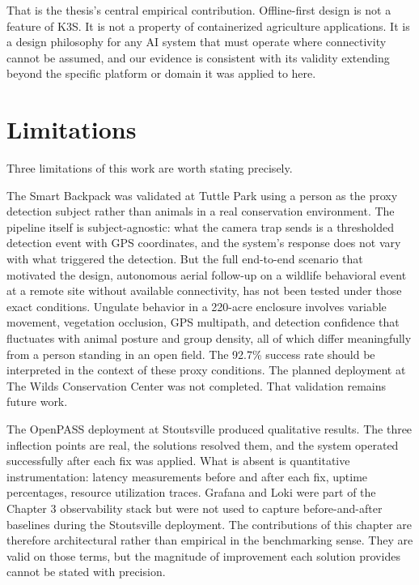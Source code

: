 That is the thesis's central empirical contribution. Offline-first design is not a feature of K3S. It is not a property of containerized agriculture applications. It is a design philosophy for any AI system that must operate where connectivity cannot be assumed, and our evidence is consistent with its validity extending beyond the specific platform or domain it was applied to here.

\section{Limitations}
\label{sec:concl_rq3}
Three limitations of this work are worth stating precisely.

The Smart Backpack was validated at Tuttle Park using a person as the proxy detection subject rather than animals in a real conservation environment. The pipeline itself is subject-agnostic: what the camera trap sends is a thresholded detection event with GPS coordinates, and the system's response does not vary with what triggered the detection. But the full end-to-end scenario that motivated the design, autonomous aerial follow-up on a wildlife behavioral event at a remote site without available connectivity, has not been tested under those exact conditions. Ungulate behavior in a 220-acre enclosure involves variable movement, vegetation occlusion, GPS multipath, and detection confidence that fluctuates with animal posture and group density, all of which differ meaningfully from a person standing in an open field. The 92.7\% success rate should be interpreted in the context of these proxy conditions. The planned deployment at The Wilds Conservation Center was not completed. That validation remains future work.

The OpenPASS deployment at Stoutsville produced qualitative results. The three inflection points are real, the solutions resolved them, and the system operated successfully after each fix was applied. What is absent is quantitative instrumentation: latency measurements before and after each fix, uptime percentages, resource utilization traces. Grafana and Loki were part of the Chapter 3 observability stack but were not used to capture before-and-after baselines during the Stoutsville deployment. The contributions of this chapter are therefore architectural rather than empirical in the benchmarking sense. They are valid on those terms, but the magnitude of improvement each solution provides cannot be stated with precision.

